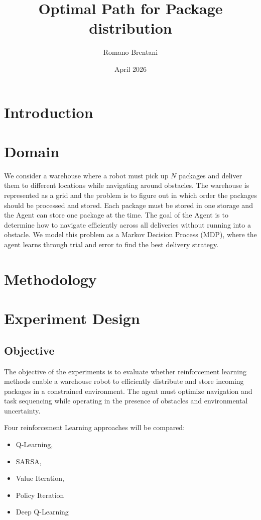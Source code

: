 \documentclass{article}
\title{Optimal Path for Package distribution}
\author{Romano Brentani}
\date{April 2026}
\begin{document}
\maketitle

\section{Introduction}

\section{Domain}
We consider a warehouse where a robot must pick up $N$ packages and deliver them to different locations while navigating around obstacles. The warehouse is represented as a grid and the problem is to figure out in which order the packages should be processed and stored. 
Each package must be stored in one storage and the Agent can store one package at the time. The goal of the Agent is to determine how to navigate efficiently across all deliveries without running into a obstacle. We model this problem as a Markov Decision Process (MDP), where the agent learns through trial and error to find the best delivery strategy.

\section{Methodology}

\section{Experiment Design}

\subsection{Objective}

The objective of the experiments is to evaluate whether reinforcement learning methods enable a warehouse robot to efficiently distribute and store incoming packages in a constrained environment. The agent must optimize navigation and task sequencing while operating in the presence of obstacles and environmental uncertainty.

Four reinforcement Learning approaches will be compared:

\begin{itemize}
    \item Q-Learning,
    \item SARSA,
    \item Value Iteration,
    \item Policy Iteration
    \item Deep Q-Learning
\end{itemize}
\end{document}
